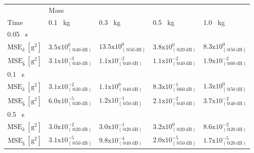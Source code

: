 {{\begin{table}[h!]
\begin{tabular}{l|l l l l} 
 \hline
 & Mass & \\ [0.5ex] 
 Time & 0.1 \ kg & 0.3 \ kg & 0.5 \ kg & 1.0 \ kg \\ 
 \hline
\multicolumn{1}{l|}{0.05 \ s} & \\
 \multicolumn{1}{r|}{\hspace{1mm} $\mathrm{MSE}_{\hat{a}} \ \mathrm{[g^2]}$} & $3.5\mathrm{x}10^{0}_{(@40 \ \mathrm{dB})}$ & $13.5\mathrm{x}10^{0}_{(@50 \ \mathrm{dB})}$ & $3.8\mathrm{x}10^{0}_{(@20 \ \mathrm{dB})}$ & $8.3\mathrm{x}10^{0}_{(@50 \ \mathrm{dB})}$ \\ 
\multicolumn{1}{r|}{\hspace{1mm} $\mathrm{MSE}_{\hat{b}} \ \mathrm{[g^2]}$} & $3.1\mathrm{x}10^{-3}_{(@40 \ \mathrm{dB})}$ & $1.1\mathrm{x}10^{-2}_{(@40 \ \mathrm{dB})}$ & $1.1\mathrm{x}10^{-2}_{(@40 \ \mathrm{dB})}$ & $1.9\mathrm{x}10^{-2}_{(@60 \ \mathrm{dB})}$ \\
\multicolumn{1}{l|}{0.1 \ s} & \\
 \multicolumn{1}{r|}{\hspace{1mm} $\mathrm{MSE}_{\hat{a}} \ \mathrm{[g^2]}$} & $3.1\mathrm{x}10^{-2}_{(@30 \ \mathrm{dB})}$ & $1.1\mathrm{x}10^{0}_{(@40 \ \mathrm{dB})}$ & $8.3\mathrm{x}10^{-1}_{(@60 \ \mathrm{dB})}$ & $1.3\mathrm{x}10^{0}_{(@50 \ \mathrm{dB})}$ \\
\multicolumn{1}{r|}{\hspace{1mm} $\mathrm{MSE}_{\hat{b}} \ \mathrm{[g^2]}$} & $6.0\mathrm{x}10^{-5}_{(@30 \ \mathrm{dB})}$ & $1.2\mathrm{x}10^{-1}_{(@50 \ \mathrm{dB})}$ & $2.1\mathrm{x}10^{-2}_{(@40 \ \mathrm{dB})}$ & $3.7\mathrm{x}10^{-2}_{(@40 \ \mathrm{dB})}$ \\
\multicolumn{1}{l|}{0.5 \ s} & \\
 \multicolumn{1}{r|}{\hspace{1mm} $\mathrm{MSE}_{\hat{a}} \ \mathrm{[g^2]}$} & $3.0\mathrm{x}10^{-2}_{(@20 \ \mathrm{dB})}$ & $3.0\mathrm{x}10^{-1}_{(@20 \ \mathrm{dB})}$ & $3.2\mathrm{x}10^{0}_{(@20 \ \mathrm{dB})}$ & $8.6\mathrm{x}10^{-2}_{(@20 \ \mathrm{dB})}$ \\
\multicolumn{1}{r|}{\hspace{1mm} $\mathrm{MSE}_{\hat{b}} \ \mathrm{[g^2]}$} & $3.1\mathrm{x}10^{-5}_{(@50 \ \mathrm{dB})}$ & $9.8\mathrm{x}10^{-4}_{(@40 \ \mathrm{dB})}$ & $2.0\mathrm{x}10^{-5}_{(@50 \ \mathrm{dB})}$ & $1.7\mathrm{x}10^{-5}_{(@20 \ \mathrm{dB})}$ \\ [0.5ex] %
 \hline
\end{tabular}
\label{table:differentmasses}
\end{table}


}}
